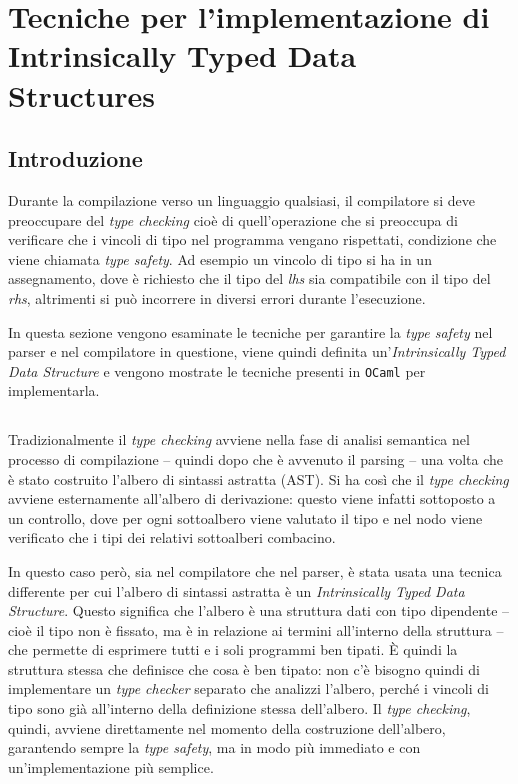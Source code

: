 \documentclass[]{article}
\begin{document}
\hypertarget{tecniche-per-limplementazione-di-intrinsically-typed-data-structures}{%
\section{Tecniche per l'implementazione di Intrinsically Typed Data
Structures}\label{tecniche-per-limplementazione-di-intrinsically-typed-data-structures}}

\hypertarget{introduzione-1}{%
\subsection{Introduzione}\label{introduzione-1}}

Durante la compilazione verso un linguaggio qualsiasi, il compilatore si
deve preoccupare del \emph{type checking} cioè di quell'operazione che
si preoccupa di verificare che i vincoli di tipo nel programma vengano
rispettati, condizione che viene chiamata \emph{type safety}. Ad esempio
un vincolo di tipo si ha in un assegnamento, dove è richiesto che il
tipo del \emph{lhs} sia compatibile con il tipo del \emph{rhs},
altrimenti si può incorrere in diversi errori durante l'esecuzione.

In questa sezione vengono esaminate le tecniche per garantire la
\emph{type safety} nel parser e nel compilatore in questione, viene
quindi definita un'\emph{Intrinsically Typed Data Structure} e vengono
mostrate le tecniche presenti in \texttt{OCaml} per implementarla.

\hypertarget{section}{%
\subsection{}\label{section}}

Tradizionalmente il \emph{type checking} avviene nella fase di analisi
semantica nel processo di compilazione -- quindi dopo che è avvenuto il
parsing -- una volta che è stato costruito l'albero di sintassi astratta
(AST). Si ha così che il \emph{type checking} avviene esternamente
all'albero di derivazione: questo viene infatti sottoposto a un
controllo, dove per ogni sottoalbero viene valutato il tipo e nel nodo
viene verificato che i tipi dei relativi sottoalberi combacino.

In questo caso però, sia nel compilatore che nel parser, è stata usata
una tecnica differente per cui l'albero di sintassi astratta è un
\emph{Intrinsically Typed Data Structure}. Questo significa che l'albero
è una struttura dati con tipo dipendente -- cioè il tipo non è fissato,
ma è in relazione ai termini all'interno della struttura -- che permette
di esprimere tutti e i soli programmi ben tipati. È quindi la struttura
stessa che definisce che cosa è ben tipato: non c'è bisogno quindi di
implementare un \emph{type checker} separato che analizzi l'albero,
perché i vincoli di tipo sono già all'interno della definizione stessa
dell'albero. Il \emph{type checking}, quindi, avviene direttamente nel
momento della costruzione dell'albero, garantendo sempre la \emph{type
safety}, ma in modo più immediato e con un'implementazione più semplice.
\end{document}

